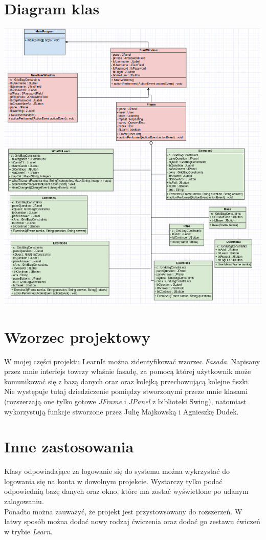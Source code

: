 \documentclass[11pt]{article}
\begin{document}
\section{Diagram klas}
\includegraphics[width=1\linewidth]{diagram.png}

\section{Wzorzec projektowy}

W mojej części projektu LearnIt można zidentyfikować wzorzec \textit{Fasada}. Napisany przez mnie interfejs towrzy właśnie fasadę, za pomocą której użytkownik może komunikować się z bazą danych oraz oraz kolejką przechowującą kolejne fiszki. Nie występuje tutaj dziedziczenie pomiędzy stworzonymi przeze mnie klasami (rozszerzają one tylko gotowe \textit{JFrame} i \textit{JPanel} z biblioteki Swing), natomiast wykorzystują funkcje stworzone przez Julię Majkowską i Agnieszkę Dudek.

\section{Inne zastosowania}

Klasy odpowiadające za logowanie się do systemu można wykrzystać do logowania się na konta w dowolnym projekcie. Wystarczy tylko podać odpowiednią bazę danych oraz okno, które ma zostać wyświetlone po udanym zalogowaniu. \\
Ponadto można zauważyć, że projekt jest przystowsowany do rozszerzeń. W łatwy sposób można dodać nowy rodzaj ćwiczenia oraz dodać go zestawu ćwiczeń w trybie \textit{Learn}.
\end{document}
